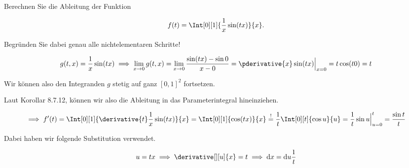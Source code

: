 
\begin{exercise}

Berechnen Sie die Ableitung der Funktion

\begin{align*}
    f(t)
    =
    \Int[0][1]
    {
        \frac{1}{x}
        \sin(t x)
    }{x}.
\end{align*}

Begründen Sie dabei genau alle nichtelementaren Schritte!

\end{exercise}


\begin{solution}

\phantom{}

\begin{align*}
    g(t, x)
    =
    \frac{1}{x}
    \sin(t x)
    \implies
    \lim_{x \to 0}
    g(t, x)
    =
    \lim_{x \to 0}
    \frac{\sin(t x) - \sin{0}}{x - 0}
    =
    \pderivative{x}
    \sin(t x)
    \Big |_{x=0}
    =
    t \cos(t 0)
    =
    t
\end{align*}

Wir können also den Integranden $g$ stetig auf ganz $[0, 1]^2$ fortsetzen.


Laut Korollar 8.7.12, können wir also die Ableitung in das Parameterintegral hineinziehen.

\begin{align*}
    \implies
    f^\prime(t)
    =
    \Int[0][1]
    {
        \derivative{t}
        \frac{1}{x}
        \sin(t x)
    }{x}
    =
    \Int[0][1]
    {
        \cos(t x)
    }{x}
    \stackrel{!}{=}
    \frac{1}{t}
    \Int[0][t]{\cos u}{u}
    =
    \frac{1}{t}
    \sin{u} \Big |_{u=0}^t
    =
    \frac{\sin t}{t}
\end{align*}

Dabei haben wir folgende Substitution verwendet.

\begin{align*}
    u = t x
    \implies
    \derivative[][u]{x} = t
    \implies
    \mathrm{d}x = \mathrm{d}u \frac{1}{t}
\end{align*}

\end{solution}

